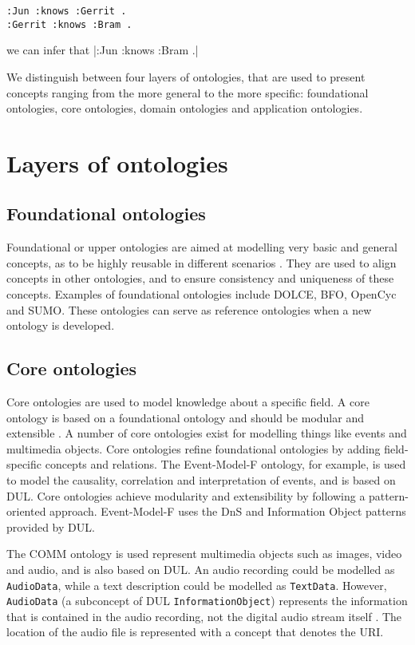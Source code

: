 \begin{verbatim}
:Jun :knows :Gerrit .
:Gerrit :knows :Bram .
\end{verbatim} 

we can infer that |:Jun :knows :Bram .|

We distinguish between four layers of ontologies, that are used to present concepts ranging from the more general to the more specific: foundational ontologies, core ontologies, domain ontologies and application ontologies.

\section{Layers of ontologies}

\subsection{Foundational ontologies}
Foundational or upper ontologies are aimed at modelling very basic and general concepts, as to be highly reusable in different scenarios \cite{Scherp2011}. They are used to align concepts in other ontologies, and to ensure consistency and uniqueness of these concepts. Examples of foundational ontologies include \ac{DOLCE}, \ac{BFO}, OpenCyc and \ac{SUMO}. These ontologies can serve as reference ontologies when a new ontology is developed.

\subsection{Core ontologies}

Core ontologies are used to model knowledge about a specific field. A core ontology is based on a foundational ontology and should be modular and extensible \cite{Scherp2011}. A number of core ontologies exist for modelling things like events and multimedia objects. Core ontologies refine foundational ontologies by adding field-specific concepts and relations. The Event-Model-F ontology, for example, is used to model the causality, correlation and interpretation of events, and is based on \ac{DUL}. Core ontologies achieve modularity and extensibility by following a pattern-oriented approach. Event-Model-F uses the \ac{DnS} and Information Object patterns provided by \ac{DUL}. 

The \ac{COMM} ontology is used represent multimedia objects such as images, video and audio, and is also based on \ac{DUL}. An audio recording could be modelled as \texttt{AudioData}, while a text description could be modelled as \texttt{TextData}. However, \texttt{AudioData} (a subconcept of \ac{DUL} \texttt{InformationObject}) represents the information that is contained in the audio recording, not the digital audio stream itself \cite{Scherp2011}. The location of the audio file is represented with a concept that denotes the \ac{URI}. 

